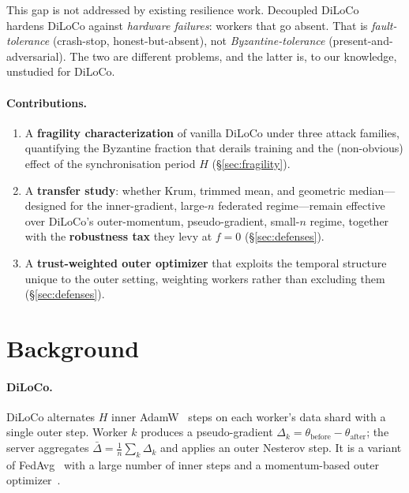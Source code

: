 \documentclass[11pt]{article}
\newcommand{\dg}{\Delta}          %
\newcommand{\agg}{\bar{\Delta}}   %
\begin{document}
This gap is not addressed by existing resilience work. Decoupled
DiLoCo~\citep{decoupleddiloco2026} hardens DiLoCo against \emph{hardware failures}: workers
that go absent. That is \emph{fault-tolerance} (crash-stop, honest-but-absent), not
\emph{Byzantine-tolerance} (present-and-adversarial). The two are different problems, and the
latter is, to our knowledge, unstudied for DiLoCo.

\paragraph{Contributions.}
\begin{enumerate}
  \item A \textbf{fragility characterization} of vanilla DiLoCo under three attack families,
  quantifying the Byzantine fraction that derails training and the (non-obvious) effect of
  the synchronisation period $H$ (\S\ref{sec:fragility}).
  \item A \textbf{transfer study}: whether Krum, trimmed mean, and geometric median---designed
  for the inner-gradient, large-$n$ federated regime---remain effective over DiLoCo's
  outer-momentum, pseudo-gradient, small-$n$ regime, together with the \textbf{robustness
  tax} they levy at $f=0$ (\S\ref{sec:defenses}).
  \item A \textbf{trust-weighted outer optimizer} that exploits the temporal structure unique
  to the outer setting, weighting workers rather than excluding them (\S\ref{sec:defenses}).
\end{enumerate}

\section{Background}
\label{sec:background}

\paragraph{DiLoCo.}
DiLoCo alternates $H$ inner AdamW~\citep{adamw2019} steps on each worker's data shard with a
single outer step. Worker $k$ produces a pseudo-gradient
$\dg_k = \theta_{\text{before}} - \theta_{\text{after}}$; the server aggregates
$\agg = \tfrac{1}{n}\sum_k \dg_k$ and applies an outer Nesterov step. It is a variant of
FedAvg~\citep{fedavg2017} with a large number of inner steps and a momentum-based outer
optimizer~\citep{outeroptimizers2025}.
\end{document}
